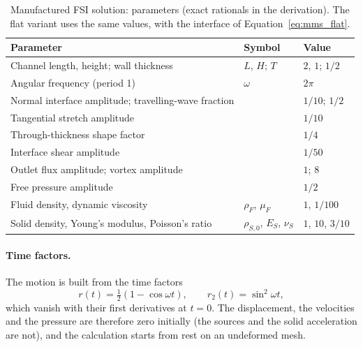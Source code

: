 \begin{table}[htbp]
	\centering
	\small
	\caption{Manufactured FSI solution: parameters (exact rationals in the derivation). The flat variant uses the same values, with the interface of Equation~\eqref{eq:mms_flat}.}
	\label{tab:mms_params}
	\begin{tabular}{lll}
		\toprule
		Parameter & Symbol & Value \\
		\midrule
		Channel length, height; wall thickness & $L$, $H$; $T$ & $2$, $1$; $1/2$ \\
		Angular frequency (period 1) & $\omega$ & $2\pi$ \\
		Normal interface amplitude; travelling-wave fraction & & $1/10$; $1/2$ \\
		Tangential stretch amplitude & & $1/10$ \\
		Through-thickness shape factor & & $1/4$ \\
		Interface shear amplitude & & $1/50$ \\
		Outlet flux amplitude; vortex amplitude & & $1$; $8$ \\
		Free pressure amplitude & & $1/2$ \\
		Fluid density, dynamic viscosity & $\rho_F$, $\mu_F$ & $1$, $1/100$ \\
		Solid density, Young's modulus, Poisson's ratio & $\rho_{S,0}$, $E_S$, $\nu_S$ & $1$, $10$, $3/10$ \\
		\bottomrule
	\end{tabular}
\end{table}

\paragraph{Time factors.}
The motion is built from the time factors
\begin{equation}
	r(t) = \tfrac{1}{2}\left(1 - \cos\omega t\right), \qquad r_2(t) = \sin^2\omega t,
	\label{eq:mms_r}
\end{equation}
which vanish with their first derivatives at $t = 0$.
The displacement, the velocities and the pressure are therefore zero initially (the sources and the solid acceleration are not), and the calculation starts from rest on an undeformed mesh.

